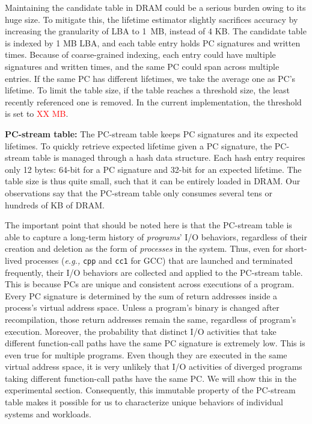 Maintaining the candidate table in DRAM could be a serious burden owing to its
huge size. To mitigate this, the lifetime estimator slightly sacrifices
accuracy by increasing the granularity of LBA to 1~MB, instead of 4 KB.  The
candidate table is indexed by 1 MB LBA, and each table entry holds PC
signatures and written times. Because of coarse-grained indexing, each entry
could have multiple signatures and written times, and the same PC could span
across multiple entries.  If the same PC has different lifetimes, we take the
average one as PC's lifetime. To limit the table size, if the table reaches a
threshold size, the least recently referenced one is removed. In the current
implementation, the threshold is set to \textcolor{red}{XX MB}.

\textbf{PC-stream table:}
The PC-stream table keeps PC signatures and its expected lifetimes. To quickly
retrieve expected lifetime given a PC signature, the PC-stream table is managed
through a hash data structure. Each hash entry requires only 12 bytes: 64-bit
for a PC signature and 32-bit for an expected lifetime.  The table size is thus
quite small, such that it can be entirely loaded in DRAM. Our observations say
that the PC-stream table only consumes several tens or hundreds of KB of DRAM.

The important point that should be noted here is that the PC-stream table is
able to capture a long-term history of \textit{programs}' I/O behaviors,
regardless of their creation and deletion as the form of \textit{processes} in
the system. Thus, even for short-lived processes (\textit{e.g.,} \texttt{cpp}
and \texttt{cc1} for GCC) that are launched and terminated frequently, their
I/O behaviors are collected and applied to the PC-stream table.  This is
because PCs are unique and consistent across executions of a program.  Every PC
signature is determined by the sum of return addresses inside a process's
virtual address space.  Unless a program's binary is changed after
recompilation, those return addresses remain the same, regardless of program's
execution.  Moreover, the probability that distinct I/O activities that take
different function-call paths have the same PC signature is extremely low. This
is even true for multiple programs. Even though they are executed in the same
virtual address space, it is very unlikely that I/O activities of diverged
programs taking different function-call paths have the same PC.  We will show
this in the experimental section. Consequently, this immutable property of
the PC-stream table makes it possible for us to characterize 
unique behaviors of individual systems and workloads.

